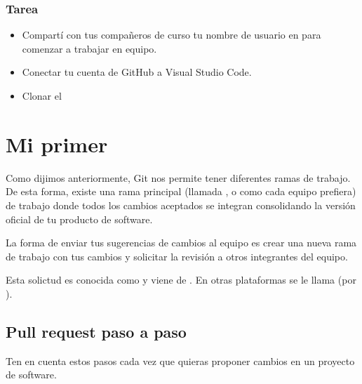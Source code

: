 \documentclass[a4paper,12pt,spanish]{sphinxmanual}
\begin{document}
\subsection{Tarea}
\label{\detokenize{github:tarea}}\begin{itemize}
\item {} 
\sphinxAtStartPar
Compartí con tus compañeros de curso tu nombre de usuario
en  para comenzar a trabajar en equipo.

\item {} 
\sphinxAtStartPar
Conectar tu cuenta de GitHub a Visual Studio Code.

\item {} 
\sphinxAtStartPar
Clonar el 

\end{itemize}

\sphinxstepscope


\chapter{Mi primer }
\label{\detokenize{mi-primer-pr:mi-primer-pr}}\label{\detokenize{mi-primer-pr::doc}}
\sphinxAtStartPar
Como dijimos anteriormente, Git nos permite tener diferentes ramas de trabajo.
De esta forma, existe una rama principal (llamada ,  o como
cada equipo prefiera) de trabajo donde todos los cambios aceptados se integran
consolidando la versión oficial de tu producto de software.

\sphinxAtStartPar
La forma de enviar tus sugerencias de cambios al equipo es crear una nueva rama
de trabajo con tus cambios y solicitar la revisión a otros integrantes del equipo.

\sphinxAtStartPar
Esta solictud es conocida como  y viene de . En otras plataformas
se le llama  (por ).


\section{Pull request paso a paso}
\label{\detokenize{mi-primer-pr:pull-request-paso-a-paso}}
\sphinxAtStartPar
Ten en cuenta estos pasos cada vez que quieras proponer cambios en un proyecto de
software.
\end{document}
